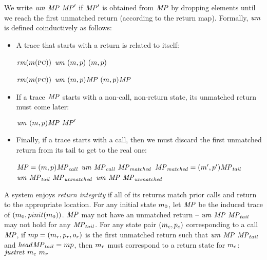 \documentclass[acmsmall,review,anonymous]{acmart}\settopmatter{printfolios=true,printccs=false,printacmref=false}
\begin{document}
We write $\mathit{um}~\mathit{MP}~\mathit{MP}'$ if $\mathit{MP}'$ is
obtained from $\mathit{MP}$ by dropping elements until we reach the first unmatched return
(according to the return map).  Formally, $\mathit{um}$ is defined coinductively as follows:
\begin{itemize}
\item A trace that starts with a return is related to itself:

\begin{minipage}{.3\textwidth}
  \judgmenttwo{\(\callmap(\mach(\PCname)) = \bot\)}
              {\(\mathit{rm}(m(\textsc{pc}))\)}
              {\(\mathit{um} ~ (m,p) ~ (m,p)\)}
\end{minipage}
\hspace*{0.1\textwidth}
\begin{minipage}{.3\textwidth}
  \judgmenttwo{\(\callmap(\mach(\PCname)) = \bot\)}
              {\(\mathit{rm}(m(\textsc{pc}))\)}
              {\(\mathit{um} ~ (m,p)\mathit{MP} ~ (m,p)\mathit{MP}\)}
\end{minipage}

\item If a trace \(\mathit{MP}\) starts with a non-call, non-return state,
  its unmatched return must come later:

           {\(\mathit{um} ~ (m,p)\mathit{MP} ~ \mathit{MP}'\)}

\item Finally, if a trace starts with a call, then we must discard the first
  unmatched return from its tail to get to the real one:


             {\(\mathit{MP} = (m,p)\mathit{MP}_{\mathit{call}}\) \quad \(\mathit{um} ~ \mathit{MP}_{\mathit{call}} ~ \mathit{MP}_{\mathit{matched}}\)}
             {\(\mathit{MP}_{\mathit{matched}} = (m',p') \mathit{MP}_{\mathit{tail}}\) \quad
              \(\mathit{um} ~ \mathit{MP}_{\mathit{tail}} ~ \mathit{MP}_{\mathit{unmatched}}\)}
            {\(\mathit{um} ~ \mathit{MP} ~ \mathit{MP}_{\mathit{unmatched}}\)}
\end{itemize}
\ifspace
{}
\fi

A system enjoys {\em return integrity} if all of its returns match prior calls
and return to the appropriate location. For any initial state \(m_0\), let
\(\mathit{MP}\) be the induced trace of \((m_0,pinit(m_0))\).
\(\mathit{MP}\) may not have an unmatched return -- \(\mathit{um} ~ \mathit{MP} ~ \mathit{MP}_{tail}\)
may not hold for any \(\mathit{MP}_{tail}\). For any state pair \((m_c, p_c)\)
corresponding to a call \(\mathit{MP}\), if
\(mp = (m_r,p_r,o_r)\)
is the first unmatched return such that
\( \mathit{um} ~ \mathit{MP} ~ \mathit{MP}_{tail}\) and \(\mathit{head}{\mathit{MP}_{tail}} = mp\),
then $m_r$ must correspond to a return state for $m_c$:
\(\mathit{justret}\ m_c\ m_r\)
\end{document}
